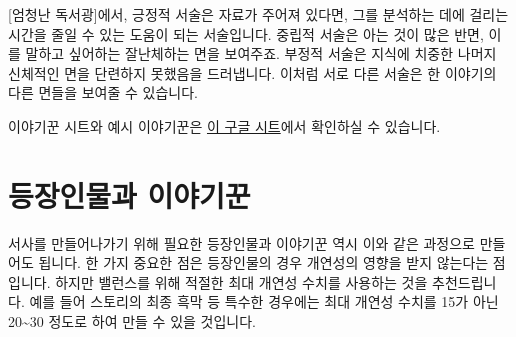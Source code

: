 \documentclass{report}
\begin{document}
	[엄청난 독서광]에서, 긍정적 서술은 자료가 주어져 있다면, 그를 분석하는 데에 걸리는 시간을 줄일 수 있는 도움이 되는 서술입니다. 중립적 서술은 아는 것이 많은 반면, 이를 말하고 싶어하는 잘난체하는 면을 보여주죠. 부정적 서술은 지식에 치중한 나머지 신체적인 면을 단련하지 못했음을 드러냅니다. 이처럼 서로 다른 서술은 한 이야기의 다른 면들을 보여줄 수 있습니다.
	
	\bigskip
	
	이야기꾼 시트와 예시 이야기꾼은 \href{https://docs.google.com/spreadsheets/d/14xSfMVRGJlXmEfHmg3_xD5Mbd9HLniCgCktDBgF5O44/edit#gid=1562620668}{이 구글 시트}에서 확인하실 수 있습니다.
	
	\section*{등장인물과 이야기꾼}
	서사를 만들어나가기 위해 필요한 등장인물과 이야기꾼 역시 이와 같은 과정으로 만들어도 됩니다. 한 가지 중요한 점은 등장인물의 경우 개연성의 영향을 받지 않는다는 점입니다. 하지만 밸런스를 위해 적절한 최대 개연성 수치를 사용하는 것을 추천드립니다. 예를 들어 스토리의 최종 흑막 등 특수한 경우에는 최대 개연성 수치를 15가 아닌 20\textasciitilde30 정도로 하여 만들 수 있을 것입니다.
\end{document}
